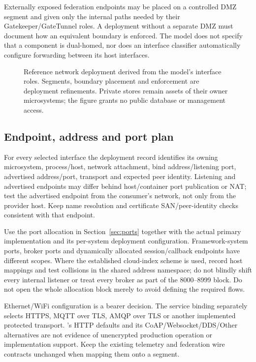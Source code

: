 Externally exposed federation endpoints may be placed on a controlled DMZ segment and given only the internal paths needed by their Gatekeeper/GateTunnel roles. A deployment without a separate DMZ must document how an equivalent boundary is enforced. The model does not specify that a component is dual-homed, nor does an interface classifier automatically configure forwarding between its host interfaces.

\begin{figure}[htbp]
\centering

\caption{Reference network deployment derived from the model's interface roles. Segments, boundary placement and enforcement are deployment refinements. Private stores remain assets of their owner microsystems; the figure grants no public database or management access.}
\label{fig:network-deployment-model}
\end{figure}
\FloatBarrier

\subsection{Endpoint, address and port plan}
For every selected interface the deployment record identifies its owning microsystem, process/host, network attachment, bind address/listening port, advertised address/port, transport and expected peer identity. Listening and advertised endpoints may differ behind host/container port publication or NAT; test the advertised endpoint from the consumer's network, not only from the provider host. Keep name resolution and certificate SAN/peer-identity checks consistent with that endpoint.

Use the port allocation in Section~\ref{sec:ports} together with the actual primary implementation and its per-system deployment configuration. Framework-system ports, broker ports and dynamically allocated session/callback endpoints have different scopes. Where the established cloud-index scheme is used, record host mappings and test collisions in the shared address namespace; do not blindly shift every internal listener or treat every broker as part of the 8000--8999 block. Do not open the whole allocation block merely to avoid defining the required flows.

Ethernet/WiFi configuration is a bearer decision. The service binding separately selects HTTPS, MQTT over TLS, AMQP over TLS or another implemented protected transport. 's HTTP defaults and its CoAP/Websocket/DDS/Other alternatives are not evidence of unencrypted production operation or implementation support. Keep the existing telemetry and federation wire contracts unchanged when mapping them onto a segment.

